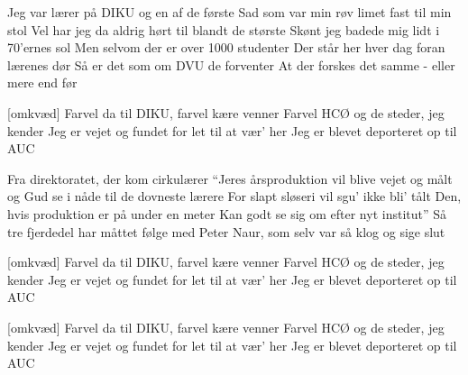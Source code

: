 \documentclass[a4paper,11pt]{article}
\begin{document}
\begin{song}

 Jeg var lærer på DIKU og en af de første
  Sad som var min røv limet fast til min stol
  Vel har jeg da aldrig hørt til blandt de største
  Skønt jeg badede mig lidt i 70'ernes sol
  Men selvom der er over 1000 studenter
  Der står her hver dag foran lærenes dør
  Så er det som om DVU de forventer
  At der forskes det samme - eller mere end før

[omkvæd] Farvel da til DIKU, farvel kære venner
  Farvel HCØ og de steder, jeg kender
  Jeg er vejet og fundet for let til at vær' her
  Jeg er blevet deporteret op til AUC


 Fra direktoratet, der kom cirkulærer
  ``Jeres årsproduktion vil blive vejet og målt
  og Gud se i nåde til de dovneste lærere
  For slapt sløseri vil sgu' ikke bli' tålt
  Den, hvis produktion er på under en meter
  Kan godt se sig om efter nyt institut''
  Så tre fjerdedel har måttet følge med Peter
  Naur, som selv var så klog og sige slut

[omkvæd] Farvel da til DIKU, farvel kære venner
  Farvel HCØ og de steder, jeg kender
  Jeg er vejet og fundet for let til at vær' her
  Jeg er blevet deporteret op til AUC

[omkvæd] Farvel da til DIKU, farvel kære venner
  Farvel HCØ og de steder, jeg kender
  Jeg er vejet og fundet for let til at vær' her
  Jeg er blevet deporteret op til AUC

\end{song}
\end{document}
